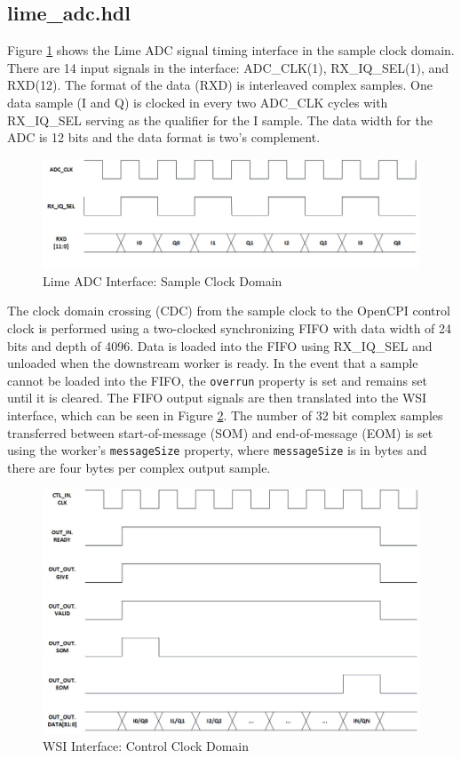 \documentclass{article}
\def\comp{lime\_adc}
\begin{document}
\subsection*{\comp.hdl}
Figure \ref{fig:lime_adc_interface} shows the Lime ADC signal timing interface in the sample clock domain. There are 14 input signals in the interface: ADC\_CLK(1), RX\_IQ\_SEL(1), and RXD(12). The format of the data (RXD) is interleaved complex samples. One data sample (I and Q) is clocked in every two ADC\_CLK cycles with RX\_IQ\_SEL serving as the qualifier for the I sample. The data width for the ADC is 12 bits and the data format is two's complement.\par\bigskip
\begin{figure}[ht]
	\centering
	\includegraphics[scale=.6]{lime_adc_interface}
	\caption{Lime ADC Interface: Sample Clock Domain}
	\label{fig:lime_adc_interface}
\end{figure}
\noindent The clock domain crossing (CDC) from the sample clock to the OpenCPI control clock is performed using a two-clocked synchronizing FIFO with data width of 24 bits and depth of 4096. Data is loaded into the FIFO using RX\_IQ\_SEL and unloaded when the downstream worker is ready. In the event that a sample cannot be loaded into the FIFO, the \verb+overrun+ property is set and remains set until it is cleared. The FIFO output signals are then translated into the WSI interface, which can be seen in Figure \ref{fig:ocpi_adc_interface}. The number of 32 bit complex samples transferred between start-of-message (SOM) and end-of-message (EOM) is set using the worker's \verb+messageSize+ property, where \verb+messageSize+ is in bytes and there are four bytes per complex output sample.\par\bigskip
\begin{figure}[ht]
	\centering
	\includegraphics[scale=.6]{ocpi_adc_interface}
	\caption{WSI Interface: Control Clock Domain}
	\label{fig:ocpi_adc_interface}
\end{figure}
\end{document}

